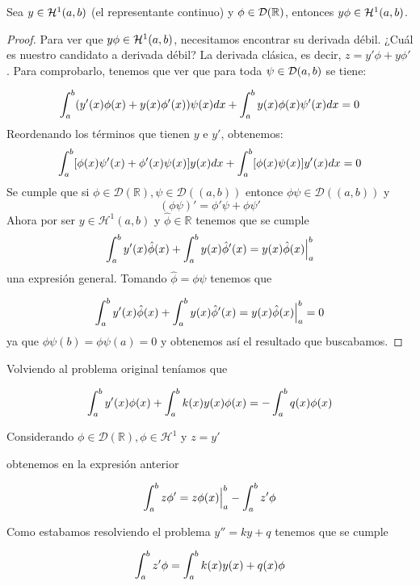 \begin{prop}\label{productoh1}
Sea $y\in\mathcal{H}^{ 1 } (a,b)$ (el representante continuo) y $\phi\in\mathcal{D}(\mathbb{R})$, entonces $y\phi\in\mathcal{H}^{ 1 } (a,b)$.
\end{prop}
\begin{proof}
Para ver que $y\phi\in\mathcal{H}^{ 1 } (a,b)$, necesitamos encontrar su derivada débil. ¿Cuál es nuestro candidato a derivada débil? La derivada clásica, es decir, $z=y'\phi+y\phi'$. Para comprobarlo, tenemos que ver que para toda $\psi\in\mathcal{D}(a,b)$ se tiene:

\[
\displaystyle\int_{ a }^{ b } (y'(x)\phi(x)+y(x)\phi'(x))\psi(x)dx+\displaystyle\int_{ a }^{ b } y(x)\phi(x)\psi'(x)dx=0
\]
Reordenando los términos que tienen $y$ e $y'$, obtenemos:
\[
\displaystyle\int_{ a }^{ b } [\phi(x)\psi'(x)+\phi'(x)\psi(x)]y(x)dx+\displaystyle\int_{ a }^{ b } [\phi(x)\psi(x)]y'(x)dx=0
\]
Se cumple que si
$\phi \in \mathcal{D}(\mathbb{R}), \psi \in \mathcal{D}((a,b))$
entonce $\phi\psi \in \mathcal{D}((a,b))$ y
\[
  (\phi\psi)' = \phi'\psi + \phi\psi'
\]
Ahora por ser $y \in \mathcal{H}^1(a,b)$ y
$\hat\phi \in \mathcal{\mathbb{R}}$ tenemos que se cumple
\[
\displaystyle\int_{ a }^{ b } y'(x)\hat\phi(x)+\displaystyle\int_{ a }^{ b } y(x)\hat\phi'(x)=y(x)\hat\phi(x)\Big|^b_a
\]
una expresión general. Tomando $\hat\phi = \phi\psi$ tenemos que 

\[
\displaystyle\int_{ a }^{ b } y'(x)\hat\phi(x)+\displaystyle\int_{ a }^{ b } y(x)\hat\phi'(x)=y(x)\hat\phi(x)\Big|^b_a = 0
\]
ya que $\phi\psi(b) = \phi\psi(a) = 0$ y obtenemos así el resultado que buscabamos.
\end{proof}

Volviendo al problema original teníamos que

\begin{equation}
  \label{eq:probleminicial}
  \displaystyle\int_{ a }^{ b } y'(x)\phi(x)+\displaystyle\int_{ a }^{ b } k(x)y(x)\phi(x)=-\displaystyle\int_{ a }^{ b } q(x)\phi(x)
\end{equation}


Considerando $\phi \in \mathcal{D}(\mathbb{R}), \phi \in \mathcal{H}^1$ y $z = y'$

obtenemos en la expresión anterior

\begin{equation}
  \label{eq:resparcial}
  \displaystyle\int_{ a }^{ b } z\phi'=z\phi(x)\Big|^b_a - \displaystyle\int_{ a }^{ b } z'\phi
\end{equation}

Como estabamos resolviendo el problema $y''=ky + q$ tenemos que se cumple

\[
\displaystyle\int_{ a }^{ b } z'\phi = \displaystyle\int_{ a }^{ b } k(x)y(x)+q(x)\phi
\]

